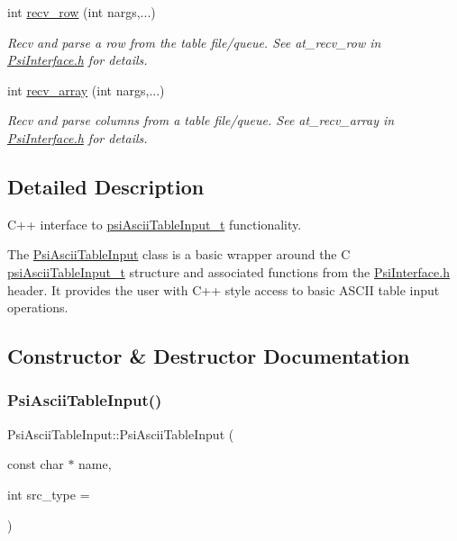 \begin{DoxyCompactItemize}
$$int \hyperlink{classPsiAsciiTableInput_a36ba3bb0a5fe6c98493bcc2bb8cc981d}{recv\+\_\+row} (int nargs,...)
\begin{DoxyCompactList}\small\item\em Recv and parse a row from the table file/queue. See at\+\_\+recv\+\_\+row in \hyperlink{PsiInterface_8h_source}{Psi\+Interface.\+h} for details. \end{DoxyCompactList}\item 
int \hyperlink{classPsiAsciiTableInput_a6485b575238765c26434319307e27f6c}{recv\+\_\+array} (int nargs,...)
\begin{DoxyCompactList}\small\item\em Recv and parse columns from a table file/queue. See at\+\_\+recv\+\_\+array in \hyperlink{PsiInterface_8h_source}{Psi\+Interface.\+h} for details. \end{DoxyCompactList}\end{DoxyCompactItemize}


\subsection{Detailed Description}
C++ interface to \hyperlink{structpsiAsciiTableInput__t}{psi\+Ascii\+Table\+Input\+\_\+t} functionality. 

The \hyperlink{classPsiAsciiTableInput}{Psi\+Ascii\+Table\+Input} class is a basic wrapper around the C \hyperlink{structpsiAsciiTableInput__t}{psi\+Ascii\+Table\+Input\+\_\+t} structure and associated functions from the \hyperlink{PsiInterface_8h_source}{Psi\+Interface.\+h} header. It provides the user with C++ style access to basic A\+S\+C\+II table input operations. 

\subsection{Constructor \& Destructor Documentation}
\mbox{\label{classPsiAsciiTableInput_a75626a21362193ab71e53b0e395f8d4c}} 
\subsubsection{\texorpdfstring{Psi\+Ascii\+Table\+Input()}{PsiAsciiTableInput()}}
{\footnotesize\ttfamily Psi\+Ascii\+Table\+Input\+::\+Psi\+Ascii\+Table\+Input (\begin{DoxyParamCaption}\item[{const char $\ast$}]{name,  }\item[{int}]{src\+\_\+type = {} }\end{DoxyParamCaption})\hspace{0.3cm}{\ttfamily [inline]}}



